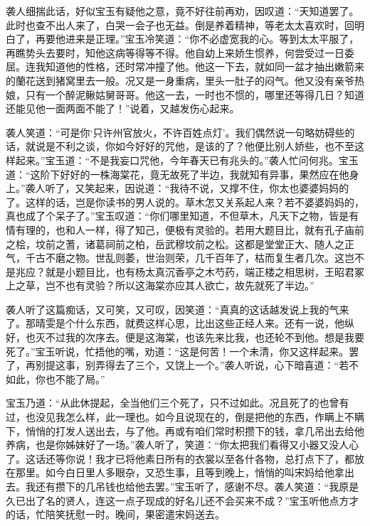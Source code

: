 \documentclass[12pt,oneside]{book}
\begin{document}
袭人细揣此话，好似宝玉有疑他之意，竟不好往前再劝，因叹道：“天知道罢了。此时也查不出人来了，白哭一会子也无益。倒是养着精神，等老太太喜欢时，回明白了，再要他进来是正理。”宝玉冷笑道：“你不必虚宽我的心。等到太太平服了，再瞧势头去要时，知他这病等得等不得。他自幼上来娇生惯养，何尝受过一日委屈。连我知道他的性格，还时常冲撞了他。他这一下去，就如同一盆才抽出嫩箭来的蘭花送到猪窝里去一般。况又是一身重病，里头一肚子的闷气。他又没有亲爷热娘，只有一个醉泥鳅姑舅哥哥。他这一去，一时也不惯的，哪里还等得几日？知道还能见他一面两面不能了！”说着，又越发伤心起来。

袭人笑道：“可是你‘只许州官放火，不许百姓点灯’。我们偶然说一句略妨碍些的话，就说是不利之谈，你如今好好的咒他，是该的了？他便比别人娇些，也不至这样起来。”宝玉道：“不是我妄口咒他，今年春天已有兆头的。”袭人忙问何兆。宝玉道：“这阶下好好的一株海棠花，竟无故死了半边，我就知有异事，果然应在他身上。”袭人听了，又笑起来，因说道：“我待不说，又撑不住，你太也婆婆妈妈的了。这样的话，岂是你读书的男人说的。草木怎又关系起人来？若不婆婆妈妈的，真也成了个呆子了。”宝玉叹道：“你们哪里知道，不但草木，凡天下之物，皆是有情有理的，也和人一样，得了知己，便极有灵验的。若用大题目比，就有孔子庙前之桧，坟前之蓍，诸葛祠前之柏，岳武穆坟前之松。这都是堂堂正大、随人之正气，千古不磨之物。世乱则萎，世治则荣，几千百年了，枯而复生者几次。这岂不是兆应？就是小题目比，也有杨太真沉香亭之木芍药，端正楼之相思树，王昭君冢上之草，岂不也有灵验？所以这海棠亦应其人欲亡，故先就死了半边。”

袭人听了这篇痴话，又可笑，又可叹，因笑道：“真真的这话越发说上我的气来了。那晴雯是个什么东西，就费这样心思，比出这些正经人来。还有一说，他纵好，也灭不过我的次序去。便是这海棠，也该先来比我，也还轮不到他。想是我要死了。”宝玉听说，忙捂他的嘴，劝道：“这是何苦！一个未清，你又这样起来。罢了，再别提这事，别弄得去了三个，又饶上一个。”袭人听说，心下暗喜道：“若不如此，你也不能了局。”

宝玉乃道：“从此休提起，全当他们三个死了，只不过如此。况且死了的也曾有过，也没见我怎么样，此一理也。如今且说现在的，倒是把他的东西，作瞒上不瞒下，悄悄的打发人送出去，与了他。再或有咱们常时积攒下的钱，拿几吊出去给他养病，也是你姊妹好了一场。”袭人听了，笑道：“你太把我们看得又小器又没人心了。这话还等你说！我才已将他素日所有的衣裳以至各什各物，总打点下了，都放在那里。如今白日里人多眼杂，又恐生事，且等到晚上，悄悄的叫宋妈给他拿出去。我还有攒下的几吊钱也给他去罢。”宝玉听了，感谢不尽。袭人笑道：“我原是久已出了名的贤人，连这一点子现成的好名儿还不会买来不成？”宝玉听他点方才的话，忙陪笑抚慰一时。晚间，果密遣宋妈送去。
\end{document}
